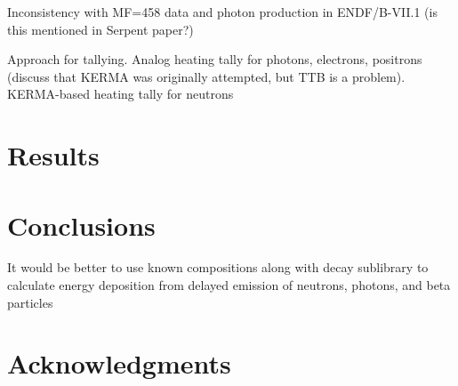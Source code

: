 \documentclass{anstrans}
\begin{document}
Inconsistency with MF=458 data and photon production in ENDF/B-VII.1 (is this
mentioned in Serpent paper?)

Approach for tallying. Analog heating tally for photons, electrons, positrons
(discuss that KERMA was originally attempted, but TTB is a problem). KERMA-based
heating tally for neutrons

\section{Results}


\section{Conclusions}

It would be better to use known compositions along with decay sublibrary to
calculate energy deposition from delayed emission of neutrons, photons, and beta
particles

\section{Acknowledgments}



\end{document}
